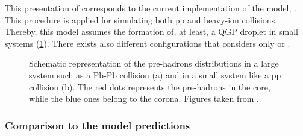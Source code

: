 This presentation of \Epos corresponds to the current implementation of the model, \EposFour. This procedure is applied for simulating both pp and heavy-ion collisions. Thereby, this model assumes the formation of, at least, a QGP droplet in small systems (\fig\ref{fig:CoreCoronaPbPbpp}). There exists also different configurations that considers only  or .

\begin{figure}[t]
\centering
{}
\caption{Schematic representation of the pre-hadrons distributions in a large system such as a Pb-Pb collision (a) and in a small system like a pp collision (b). The red dots represents the pre-hadrons in the core, while the blue ones belong to the corona. Figures taken from \cite{wernerCorecoronaProcedureMicrocanonical2023}.}
	\label{fig:CoreCoronaPbPbpp}
\end{figure}

\subsubsection{Comparison to the model predictions}



